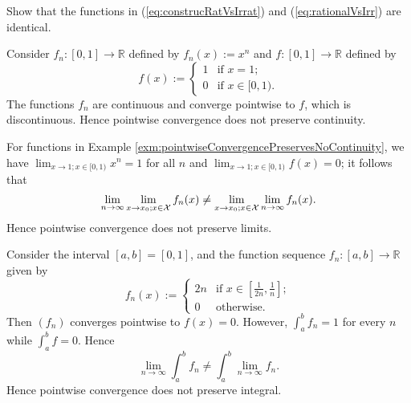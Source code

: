 \begin{exc}
  Show that the functions in (\ref{eq:construcRatVsIrrat})
  and (\ref{eq:rationalVsIrr}) are identical. 
\end{exc}

\begin{exm}
  \label{exm:pointwiseConvergencePreservesNoContinuity}
  Consider $f_n:[0,1]\rightarrow \mathbb{R}$
   defined by \mbox{$f_n(x) := x^n$}
   and $f:[0,1]\rightarrow \mathbb{R}$
   defined by 
   \begin{displaymath}
     f(x) :=
     \begin{cases}
       1 & \text{if } x=1;
       \\
       0 & \text{if } x\in [0,1).
     \end{cases}
   \end{displaymath}
  The functions $f_n$ are continuous
   and converge pointwise to $f$,
   which is discontinuous.
  Hence pointwise convergence
   does not preserve continuity.
\end{exm}

\begin{exm}
  \label{exm:pointwiseConvergencePreservesNoLimits}
  For functions
  in Example \ref{exm:pointwiseConvergencePreservesNoContinuity},
   we have \mbox{$\lim_{x\rightarrow 1; x\in [0,1)} x^n=1$} for all $n$
   and $\lim_{x\rightarrow 1; x\in [0,1)} f(x) =0$; 
   it follows that
   \begin{displaymath}
     \lim_{n\rightarrow\infty}\lim_{x\rightarrow x_0; x\in {\cal X}} f_n(x)
     \ne 
     \lim_{x\rightarrow x_0; x\in {\cal X}}\lim_{n\rightarrow\infty} f_n(x).
   \end{displaymath}
  Hence pointwise convergence does not preserve limits.
\end{exm}

\begin{exm}
  \label{exm:pointwiseConvergencePreservesNoIntegral}
  Consider the interval $[a,b]=[0,1]$,
  and the function sequence $f_n:[a,b]\rightarrow\mathbb{R}$
  given by
   \begin{displaymath}
     f_n(x) := 
     \begin{cases}
       2n & \text{if } x\in \left[\frac{1}{2n}, \frac{1}{n}\right];
       \\
       0  & \text{otherwise}.
     \end{cases}
   \end{displaymath}
  Then $(f_n)$ converges pointwise to $f(x)=0$.
  However, $\int_a^b f_n = 1$ for every $n$
   while $\int_a^b f = 0$. Hence
   \begin{displaymath}
     \lim_{n\rightarrow \infty} \int_{a}^b f_n
     \ne \int_a^b \lim_{n\rightarrow \infty} f_n.
   \end{displaymath}
  Hence pointwise convergence does not preserve integral.
\end{exm}


